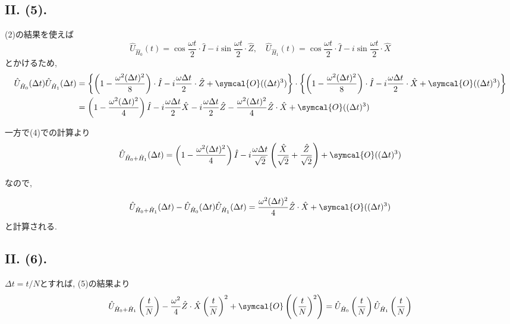 \subsection*{II. (5). }
(2)の結果を使えば
\begin{equation}
  \hat{U}_{\hat{H}_0}(t)=\cos\frac{\omega t}{2}\cdot \hat{I}-i\sin\frac{\omega t}{2}\cdot\hat{Z}, \quad \hat{U}_{\hat{H}_1}(t)=\cos\frac{\omega t}{2}\cdot \hat{I}-i\sin\frac{\omega t}{2}\cdot\hat{X} 
\end{equation}
とかけるため, 
\begin{align*}
  \hat{U}_{\hat{H}_0}(\Delta t)\hat{U}_{\hat{H}_1}(\Delta t)&=\left\{  \left( 1-\frac{\omega^2(\Delta t)^2}{8} \right)\cdot \hat{I}-i\frac{\omega\Delta t}{2}\cdot\hat{Z}+\symcal{O}((\Delta t)^3)\right\}\cdot \left\{  \left( 1-\frac{\omega^2(\Delta t)^2}{8} \right)\cdot \hat{I}-i\frac{\omega\Delta t}{2}\cdot\hat{X}+\symcal{O}((\Delta t)^3)\right\}\\
  &=\left( 1-\frac{\omega^2(\Delta t)^2}{4} \right)\hat{I}-i\frac{\omega\Delta t }{2}\hat{X}-i\frac{\omega\Delta t }{2}\hat{Z}-\frac{\omega^2(\Delta t)^2}{4}\hat{Z}\cdot\hat{X}+\symcal{O}((\Delta t)^3)
\end{align*}

一方で(4)での計算より
\begin{equation}
  \hat{U}_{\hat{H}_0+\hat{H}_1}(\Delta t)=\left( 1-\frac{\omega^2(\Delta t)^2}{4} \right)\hat{I}-i\frac{\omega\Delta t}{\sqrt{2}}\left( \frac{\hat{X}}{\sqrt{2}}+\frac{\hat{Z}}{\sqrt{2}} \right)+\symcal{O}((\Delta t)^3)
\end{equation}

なので, 

\begin{equation}
  \hat{U}_{\hat{H}_0+\hat{H}_1}(\Delta t)-\hat{U}_{\hat{H}_0}(\Delta t)\hat{U}_{\hat{H}_1}(\Delta t)=\frac{\omega^2(\Delta t)^2}{4}\hat{Z}\cdot\hat{X}+\symcal{O}((\Delta t)^3)
\end{equation}
と計算される. 


\subsection*{II. (6). }

$\Delta t=t/N$とすれば, (5)の結果より
\begin{equation}
  \hat{U}_{\hat{H}_0+\hat{H}_1}\left(\frac{t}{N}\right)-\frac{\omega^2}{4}\hat{Z}\cdot\hat{X}\left( \frac{t}{N} \right)^2+\symcal{O}\left(  \left( \frac{t}{N} \right)^2\right)=\hat{U}_{\hat{H}_0}\left(\frac{t}{N}\right)\hat{U}_{\hat{H}_1}\left(\frac{t}{N}\right)
\end{equation}

